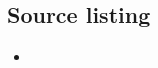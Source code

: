 %        
%
%
% 
%    
%
%


        \subsection{Source listing}
        \label{Source listing}
        
        \begin{framed}
            \begin{itemize}
                \item{}
            \end{itemize}
        \end{framed}


